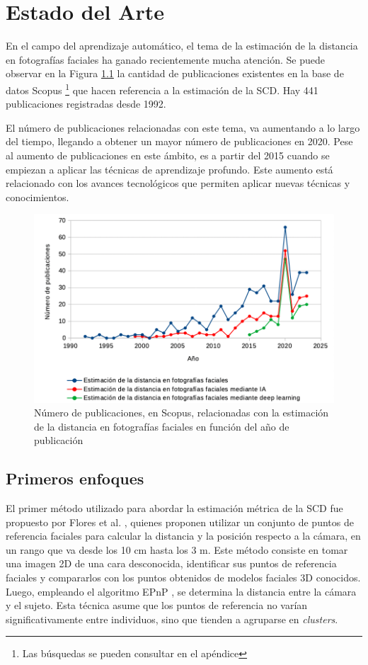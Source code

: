 \chapter{Estado del Arte}
\thispagestyle{empty}

En el campo del aprendizaje automático, el tema de la estimación de la distancia en fotografías faciales ha ganado recientemente mucha atención. Se puede observar en la Figura \ref{fig5} la cantidad de publicaciones existentes en la base de datos Scopus \footnote{Las búsquedas se pueden consultar en el apéndice} que hacen referencia a la estimación de la SCD. Hay 441 publicaciones registradas desde 1992.

El número de publicaciones relacionadas con este tema, va aumentando a lo largo del tiempo, llegando a obtener un mayor número de publicaciones en 2020. Pese al aumento de publicaciones en este ámbito, es a partir del 2015 cuando se empiezan a aplicar las técnicas de aprendizaje profundo. Este aumento está relacionado con los avances tecnológicos que permiten aplicar nuevas técnicas y conocimientos. 

\begin{figure}[h]
	\centering
	\includegraphics[scale=0.8]{imagenes/cap3/grafica_scopus5.png}
	\caption{Número de publicaciones, en Scopus, relacionadas con la estimación de la distancia en fotografías faciales en función del año de publicación}
	\label{fig5}
\end{figure}

\section{Primeros enfoques}

El primer método utilizado para abordar la estimación métrica de la SCD fue propuesto por Flores et al. \cite{28}, quienes proponen utilizar un conjunto de puntos de referencia faciales para calcular la distancia y la posición respecto a la cámara, en un rango que va desde los 10 cm hasta los 3 m.
Este método consiste en tomar una imagen 2D de una cara desconocida, identificar sus puntos de referencia faciales y compararlos con los puntos obtenidos de modelos faciales 3D conocidos. Luego, empleando el algoritmo EPnP \cite{29}, se determina la distancia entre la cámara y el sujeto. Esta técnica asume que los puntos de referencia no varían significativamente entre individuos, sino que tienden a agruparse en \textit{clusters}.

